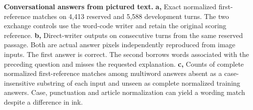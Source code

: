 \textbf{Conversational answers from pictured text.}
\textbf{a,} Exact normalized first-reference matches on 4,413 reserved and 5,588 development turns. The two exchange controls use the word-code writer and retain the original scoring reference.
\textbf{b,} Direct-writer outputs on consecutive turns from the same reserved passage. Both are actual answer pixels independently reproduced from image inputs. The first answer is correct. The second borrows words associated with the preceding question and misses the requested explanation.
\textbf{c,} Counts of complete normalized first-reference matches among multiword answers absent as a case-insensitive substring of each input and unseen as complete normalized training answers. Case, punctuation and article normalization can yield a wording match despite a difference in ink.
